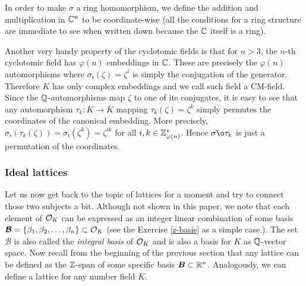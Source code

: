 In order to make $\sigma$ a ring homomorphism, we define the addition and multiplication in $\mathbb{C}^n$ to be coordinate-wise (all the conditions for a ring structure are immediate to see when written down because the $\mathbb{C}$ itself is a ring).

Another very handy property of the cyclotomic fields is that for $n > 3$, the $n$-th cyclotomic field has $\varphi(n)$ embeddings in $\mathbb{C}$. These are precisely the $\varphi(n)$ automorphisms where $\sigma_i(\zeta) = \zeta^i$ is simply the conjugation of the generator. Therefore $K$ has only complex embeddings and we call such field a CM-field. Since the $\mathbb{Q}$-automorphisms map $\zeta$ to one of its conjugates, it is easy to see that any automorphism $\tau_k : K \rightarrow K$ mapping $\tau_k(\zeta) = \zeta^k$ simply permutes the coordinates of the canonical embedding. More precisely, $\sigma_i(\tau_k(\zeta)) = \sigma_i(\zeta^k) = \zeta^{ik}$ for all $i,k \in \mathbb{Z}_{\varphi(n)}^*$. Hence $\sigma \o \tau_k$ is just a permutation of the coordinates.

\subsubsection*{Ideal lattices}
Let us now get back to the topic of lattices for a moment and try to connect those two subjects a bit. Although not shown in this paper, we note that each element of $\mathcal{O}_K$ can be expressed as an integer linear combination of some basis $\boldsymbol{\mathcal{B}} = \{\beta_1, \beta_2, \ldots, \beta_n \} \subset \mathcal{O}_K$ (see the Exercise \ref{z-basis} as a simple case.). The set $\bm{\mathcal{B}}$ is also called the \textit{integral basis} of $\mathcal{O}_K$ and is also a basis for $K$ as $\mathbb{Q}$-vector space. Now recall from the beginning of the previous section that any lattice can be defined as the $\mathbb{Z}$-span of some specific basis $\boldsymbol{B} \subset \mathbb{R}^n$. Analogously, we can define a lattice for any number field $K$.


